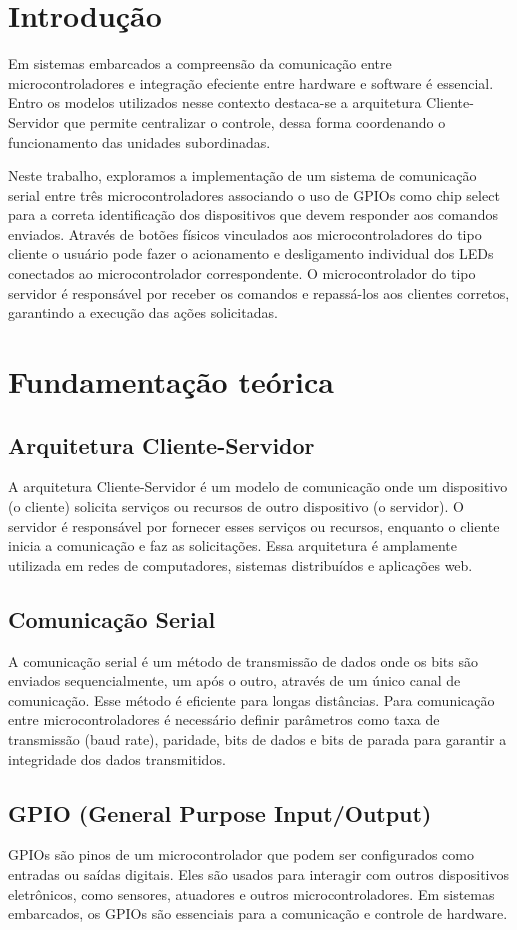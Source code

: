 \documentclass[12pt, a4paper]{article}
\begin{document}
\section{Introdução}
Em sistemas embarcados a compreensão da comunicação entre microcontroladores e integração efeciente entre hardware e software é essencial. Entro os modelos utilizados nesse contexto destaca-se a arquitetura Cliente-Servidor que permite centralizar o controle, dessa forma coordenando o funcionamento das unidades subordinadas.

Neste trabalho, exploramos a implementação de um sistema de comunicação serial entre três microcontroladores associando o uso de GPIOs como chip select para a correta identificação dos dispositivos que devem responder aos comandos enviados. Através de botões físicos vinculados aos microcontroladores do tipo cliente o usuário pode fazer o acionamento e desligamento individual dos LEDs conectados ao microcontrolador correspondente. O microcontrolador do tipo servidor é responsável por receber os comandos e repassá-los aos clientes corretos, garantindo a execução das ações solicitadas.

\section{Fundamentação teórica}
\subsection{Arquitetura Cliente-Servidor}
A arquitetura Cliente-Servidor é um modelo de comunicação onde um dispositivo (o cliente) solicita serviços ou recursos de outro dispositivo (o servidor). O servidor é responsável por fornecer esses serviços ou recursos, enquanto o cliente inicia a comunicação e faz as solicitações. Essa arquitetura é amplamente utilizada em redes de computadores, sistemas distribuídos e aplicações web.
\subsection{Comunicação Serial}
A comunicação serial é um método de transmissão de dados onde os bits são enviados sequencialmente, um após o outro, através de um único canal de comunicação. Esse método é eficiente para longas distâncias. Para comunicação entre microcontroladores é necessário definir parâmetros como taxa de transmissão (baud rate), paridade, bits de dados e bits de parada para garantir a integridade dos dados transmitidos.
\subsection{GPIO (General Purpose Input/Output)}
GPIOs são pinos de um microcontrolador que podem ser configurados como entradas ou saídas digitais. Eles são usados para interagir com outros dispositivos eletrônicos, como sensores, atuadores e outros microcontroladores. Em sistemas embarcados, os GPIOs são essenciais para a comunicação e controle de hardware.
\end{document}
